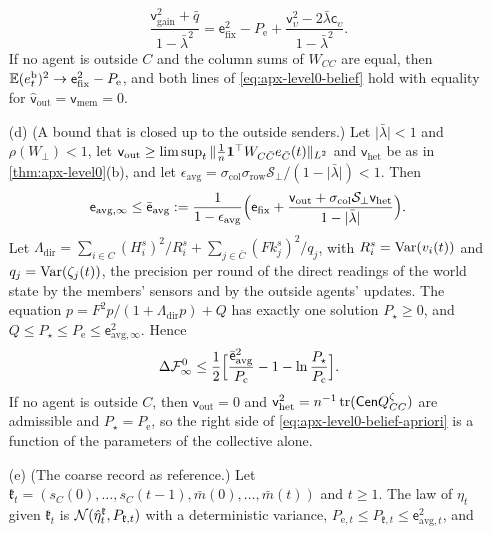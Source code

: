 \begin{proposition}
\begin{enumerate}
\begin{equation}
\frac{\mathsf v_{\mathrm{gain}}^2+\bar q}{1-\bar\lambda^2}=\mathsf e_{\mathrm{fix}}^2-P_{\mathrm e}+\frac{\mathsf v_\upsilon^2-2\bar\lambda\mathsf c_\upsilon}{1-\bar\lambda^2} .
\end{equation}
If no agent is outside $C$ and the column sums of $W_{CC}$ are equal, then $\E(e^{\mathrm b}_t)^2\to\mathsf e_{\mathrm{fix}}^2-P_{\mathrm e}$, and both lines of \eqref{eq:apx-level0-belief} hold with equality for $\hat{\mathsf v}_{\mathrm{out}}=\mathsf v_{\mathrm{mem}}=0$.
\item[(d)] (A bound that is closed up to the outside senders.) Let $\lvert\bar\lambda\rvert<1$ and $\rho(W_\perp)<1$, let $\mathsf v_{\mathrm{out}}\ge\limsup_t\Vert\frac1n\mathbf{1}^\top W_{C\bar C}e_{\bar C}(t)\Vert_{L^2}$ and $\mathsf v_{\mathrm{het}}$ be as in \cref{thm:apx-level0}(b), and let $\epsilon_{\mathrm{avg}}=\sigma_{\mathrm{col}}\sigma_{\mathrm{row}}\mathcal S_\perp/(1-\lvert\bar\lambda\rvert)<1$. Then
\begin{equation}\label{eq:apx-level0-belief-avg}
\mathsf e_{\mathrm{avg},\infty}\le\bar{\mathsf e}_{\mathrm{avg}}:=\frac{1}{1-\epsilon_{\mathrm{avg}}}\Bigl(\mathsf e_{\mathrm{fix}}+\frac{\mathsf v_{\mathrm{out}}+\sigma_{\mathrm{col}}\mathcal S_\perp\mathsf v_{\mathrm{het}}}{1-\lvert\bar\lambda\rvert}\Bigr).
\end{equation}
Let $\Lambda_{\mathrm{dir}}=\sum_{i\in C}(H^s_i)^2/R^s_i+\sum_{j\in\bar C}(Fk^s_j)^2/q_j$, with $R^s_i=\operatorname{Var}(v_i(t))$ and $q_j=\operatorname{Var}(\zeta_j(t))$, the precision per round of the direct readings of the world state by the members' sensors and by the outside agents' updates. The equation $p=F^2p/(1+\Lambda_{\mathrm{dir}}p)+Q$ has exactly one solution $P_\star\ge0$, and $Q\le P_\star\le P_{\mathrm e}\le\mathsf e_{\mathrm{avg},\infty}^2$. Hence
\begin{equation}\label{eq:apx-level0-belief-apriori}
\Delta\mathcal F^0_\infty\le\frac12\Bigl[\frac{\bar{\mathsf e}_{\mathrm{avg}}^2}{P_{\mathrm c}}-1-\ln\frac{P_\star}{P_{\mathrm c}}\Bigr].
\end{equation}
If no agent is outside $C$, then $\mathsf v_{\mathrm{out}}=0$ and $\mathsf v_{\mathrm{het}}^2=n^{-1}\operatorname{tr}(\mathsf{Cen}Q^\zeta_{CC})$ are admissible and $P_\star=P_{\mathrm e}$, so the right side of \eqref{eq:apx-level0-belief-apriori} is a function of the parameters of the collective alone.
\item[(e)] (The coarse record as reference.) Let $\mathfrak k_t=(s_C(0),\dots,s_C(t-1),\bar m(0),\dots,\bar m(t))$ and $t\ge1$. The law of $\eta_t$ given $\mathfrak k_t$ is $\mathcal{N}(\hat\eta^{\mathfrak k}_t,P_{\mathfrak k,t})$ with a deterministic variance, $P_{\mathrm e,t}\le P_{\mathfrak k,t}\le\mathsf e_{\mathrm{avg},t}^2$, and

\end{enumerate}
\end{proposition}
